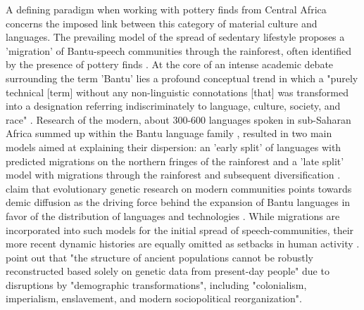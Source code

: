 \documentclass[smallextended,natbib]{svjour3}       %
\begin{document}
A defining paradigm when working with pottery finds from Central Africa concerns the imposed link between this category of material culture and languages. The prevailing model of the spread of sedentary lifestyle proposes a 'migration' of Bantu-speech communities through the rainforest, often identified by the presence of pottery finds \citep{Currie.2013,Bostoen.2015,Grollemund.2015,Koile.2022,Grollemund.2023}. At the core of an intense academic debate surrounding the term 'Bantu' \citep[cf.][]{Oliver.1966,Vansina.1979,Vansina.1980,Robertson.2000,Eggert.2005,Eggert.2016a} lies a profound conceptual trend in which a "purely technical [term] without any non-linguistic connotations [that] was transformed into a designation referring indiscriminately to language, culture, society, and race" \citep[302]{Eggert.2005}. Research of the modern, about 300-600 languages spoken in sub-Saharan Africa summed up within the Bantu language family \citep{Nurse.2003,Bostoen.2018}, resulted in two main models aimed at explaining their dispersion: an 'early split' of languages with predicted migrations on the northern fringes of the rainforest and a 'late split' model with migrations through the rainforest and subsequent diversification \citep{Bostoen.2018,Bostoen.2020}. \citet{Pakendorf.2011} claim that evolutionary genetic research on modern communities points towards demic diffusion as the driving force behind the expansion of Bantu languages in favor of the distribution of languages and technologies \citep{Bostoen.2022}. While migrations are incorporated into such models for the initial spread of speech-communities, their more recent dynamic histories \citep[cf.][83]{Vennetier.1963} are equally omitted as setbacks in human activity \citep{Oslisly.1998,Oslisly.2013b,Saulieu.2017,deSaulieu.2021a,Seidensticker.2021}. \citet[1]{Lipson.2022} point out that "the structure of ancient populations cannot be robustly reconstructed based solely on genetic data from present-day people" due to disruptions by "demographic transformations", including "colonialism, imperialism, enslavement, and modern sociopolitical reorganization".
\end{document}
